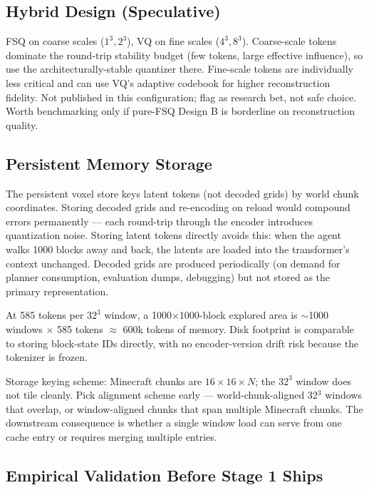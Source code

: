 \documentclass[11pt,a4paper]{article}
\begin{document}
\subsection{Hybrid Design (Speculative)}

FSQ on coarse scales ($1^3, 2^3$), VQ on fine scales ($4^3, 8^3$). Coarse-scale tokens dominate the round-trip stability budget (few tokens, large effective influence), so use the architecturally-stable quantizer there. Fine-scale tokens are individually less critical and can use VQ's adaptive codebook for higher reconstruction fidelity. Not published in this configuration; flag as research bet, not safe choice. Worth benchmarking only if pure-FSQ Design B is borderline on reconstruction quality.

\subsection{Persistent Memory Storage}

The persistent voxel store keys latent tokens (not decoded grids) by world chunk coordinates. Storing decoded grids and re-encoding on reload would compound errors permanently --- each round-trip through the encoder introduces quantization noise. Storing latent tokens directly avoids this: when the agent walks 1000 blocks away and back, the latents are loaded into the transformer's context unchanged. Decoded grids are produced periodically (on demand for planner consumption, evaluation dumps, debugging) but not stored as the primary representation.

At 585 tokens per $32^3$ window, a 1000$\times$1000-block explored area is $\sim$1000 windows $\times$ 585 tokens $\approx$ 600k tokens of memory. Disk footprint is comparable to storing block-state IDs directly, with no encoder-version drift risk because the tokenizer is frozen.

\begin{openquestion}
Storage keying scheme: Minecraft chunks are $16 \times 16 \times N$; the $32^3$ window does not tile cleanly. Pick alignment scheme early --- world-chunk-aligned 32$^3$ windows that overlap, or window-aligned chunks that span multiple Minecraft chunks. The downstream consequence is whether a single window load can serve from one cache entry or requires merging multiple entries.
\end{openquestion}

\subsection{Empirical Validation Before Stage 1 Ships}
\label{sec:tok-validation}
\end{document}
